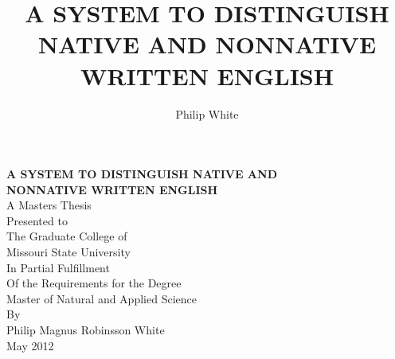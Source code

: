 \documentclass[12pt]{article}
\title{\textbf{A SYSTEM TO DISTINGUISH NATIVE AND NONNATIVE WRITTEN ENGLISH}}
\author{Philip White}
\def\biblio{}
\let\stdsection\section
\renewcommand\section{\clearpage\stdsection}
\begin{document}
\def\biblio{} %

{}
\begin{titlepage}

\centering

\textbf{A SYSTEM TO DISTINGUISH NATIVE AND\\NONNATIVE WRITTEN ENGLISH}\\

\null\null
A Masters Thesis\\
Presented to\\
The Graduate College of\\
Missouri State University\\
\null\null\null\null
In Partial Fulfillment\\
Of the Requirements for the Degree\\
Master of Natural and Applied Science\\
\null\null\null\null
By\\
Philip Magnus Robinsson White\\
May 2012

\end{titlepage}
\setcounter{page}{2}

\newpage


\begingroup
\setlength{\cftbeforesecskip}{12pt}
\setlength{\cftbeforesubsecskip}{0pt}
\setlength{\cftbeforefigskip}{12pt}
\setlength{\cftbeforetabskip}{12pt}
\singlespacing
\tableofcontents

\listoftables
\listoffigures
\endgroup

\setlength{\intextsep}{24pt}

\doublespacing
\newpage
{}
\setcounter{page}{1}
\setcounter{secnumdepth}{-1}

\titleformat{\section}{\normalfont\bfseries\centering}{}{}{\MakeUppercase}
\titleformat{\subsection}{\normalfont\bfseries}{}{}{}
\titlespacing{\section}{0pt}{0pt}{24pt}
\titlespacing*{\subsection}{0pt}{24pt}{0pt}
\end{document}
